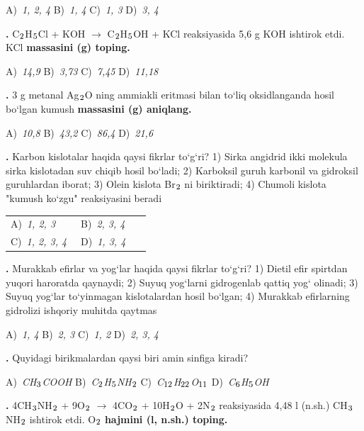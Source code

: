 \documentclass[11pt,a4paper]{article}
\renewcommand{\textsubscript}[1]{\ensuremath{_{\text{\fontsize{8}{8}\selectfont #1}}}}
\newcommand{\qn}[1]{\textbf{\fontsize{11.5}{13}\selectfont #1}}
\newcommand{\qsep}{\par\vspace{1pt}\noindent\rule{0pt}{0.4pt}\par\vspace{5pt}}
\begin{document}
\begin{multicols}{2}
\noindent A)~\textsl{1, 2, 4} \hfill B)~\textsl{1, 4} \hfill C)~\textsl{1, 3} \hfill D)~\textsl{3, 4}\par
\qsep
\noindent\qn{23.} C\textsubscript{2}H\textsubscript{5}Cl + KOH $\to$ C\textsubscript{2}H\textsubscript{5}OH + KCl reaksiyasida 5,6 g KOH ishtirok etdi. KCl \textbf{massasini (g) toping.}

\noindent A)~\textsl{14,9} \hfill B)~\textsl{3,73} \hfill C)~\textsl{7,45} \hfill D)~\textsl{11,18}\par
\qsep
\noindent\qn{24.} 3 g metanal Ag\textsubscript{2}O ning ammiakli eritmasi bilan to`liq oksidlanganda hosil bo`lgan kumush \textbf{massasini (g) aniqlang.}

\noindent A)~\textsl{10,8} \hfill B)~\textsl{43,2} \hfill C)~\textsl{86,4} \hfill D)~\textsl{21,6}\par
\qsep
\noindent\qn{25.} Karbon kislotalar haqida qaysi fikrlar to`g`ri? 1) Sirka angidrid ikki molekula sirka kislotadan suv chiqib hosil bo`ladi; 2) Karboksil guruh karbonil va gidroksil guruhlardan iborat; 3) Olein kislota Br\textsubscript{2} ni biriktiradi; 4) Chumoli kislota "kumush ko`zgu" reaksiyasini beradi

\noindent\begin{tabular}{@{}p{0.47\linewidth}@{}p{0.47\linewidth}@{}}
A)~\textsl{1, 2, 3} & B)~\textsl{2, 3, 4} \\
C)~\textsl{1, 2, 3, 4} & D)~\textsl{1, 3, 4} \\
\end{tabular}\par
\qsep
\noindent\qn{26.} Murakkab efirlar va yog`lar haqida qaysi fikrlar to`g`ri? 1) Dietil efir spirtdan yuqori haroratda qaynaydi; 2) Suyuq yog`larni gidrogenlab qattiq yog` olinadi; 3) Suyuq yog`lar to`yinmagan kislotalardan hosil bo`lgan; 4) Murakkab efirlarning gidrolizi ishqoriy muhitda qaytmas

\noindent A)~\textsl{1, 4} \hfill B)~\textsl{2, 3} \hfill C)~\textsl{1, 2} \hfill D)~\textsl{2, 3, 4}\par
\qsep
\noindent\qn{27.} Quyidagi birikmalardan qaysi biri amin sinfiga kiradi?

\noindent A)~\textsl{CH\textsubscript{3}COOH} \hfill B)~\textsl{C\textsubscript{2}H\textsubscript{5}NH\textsubscript{2}} \hfill C)~\textsl{C\textsubscript{12}H\textsubscript{22}O\textsubscript{11}} \hfill D)~\textsl{C\textsubscript{6}H\textsubscript{5}OH}\par
\qsep
\noindent\qn{28.} 4CH\textsubscript{3}NH\textsubscript{2} + 9O\textsubscript{2} $\to$ 4CO\textsubscript{2} + 10H\textsubscript{2}O + 2N\textsubscript{2} reaksiyasida 4,48 l (n.sh.) CH\textsubscript{3}NH\textsubscript{2} ishtirok etdi. O\textsubscript{2} \textbf{hajmini (l, n.sh.) toping.}


\end{multicols}
\end{document}

